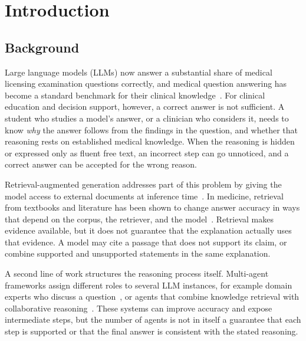 \chapter{Introduction}
\label{chap:introduction}


\section{Background}
\label{sec:background}

Large language models (LLMs) now answer a substantial share of medical licensing examination questions correctly, and medical question answering has become a standard benchmark for their clinical knowledge~\cite{jin_medqa_2021}. For clinical education and decision support, however, a correct answer is not sufficient. A student who studies a model's answer, or a clinician who considers it, needs to know \emph{why} the answer follows from the findings in the question, and whether that reasoning rests on established medical knowledge. When the reasoning is hidden or expressed only as fluent free text, an incorrect step can go unnoticed, and a correct answer can be accepted for the wrong reason.

Retrieval-augmented generation addresses part of this problem by giving the model access to external documents at inference time~\cite{lewis_rag_2020}. In medicine, retrieval from textbooks and literature has been shown to change answer accuracy in ways that depend on the corpus, the retriever, and the model~\cite{xiong_medrag_2024}. Retrieval makes evidence available, but it does not guarantee that the explanation actually uses that evidence. A model may cite a passage that does not support its claim, or combine supported and unsupported statements in the same explanation.

A second line of work structures the reasoning process itself. Multi-agent frameworks assign different roles to several LLM instances, for example domain experts who discuss a question~\cite{tang_medagents_2024}, or agents that combine knowledge retrieval with collaborative reasoning~\cite{li_kacr_2025,tan_graphdx_2026}. These systems can improve accuracy and expose intermediate steps, but the number of agents is not in itself a guarantee that each step is supported or that the final answer is consistent with the stated reasoning.

